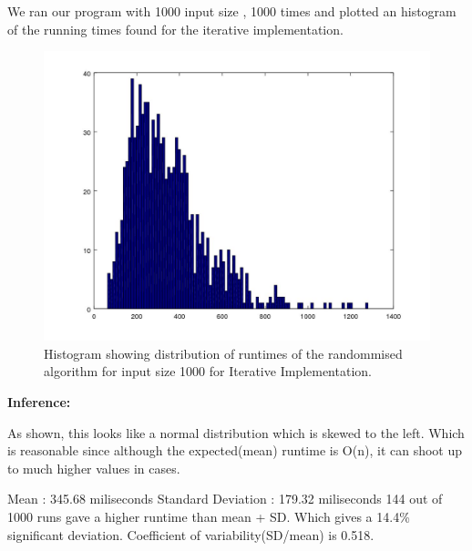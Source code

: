 \documentclass{article}
\begin{document}
We ran our program with 1000 input size , 1000 times and plotted an histogram of the running times found for the iterative implementation. 
	
\begin{figure}[th]%
\centering
\includegraphics[width=0.8\columnwidth]{hist.jpg}%
\caption{Histogram showing distribution of runtimes of the randommised algorithm for input size 1000 for Iterative Implementation. }
\label{fig:proto}%
\end{figure}

\textbf{Inference:}

As shown, this looks like a normal distribution which is skewed to the left. Which is reasonable since although the expected(mean) runtime is O(n), it can shoot up to much higher values in cases.

Mean : 345.68 miliseconds
Standard Deviation : 179.32 miliseconds
144 out of 1000 runs gave a higher runtime than mean + SD. Which gives a 14.4\% significant deviation. Coefficient of variability(SD/mean) is 0.518.\\
\end{document}
